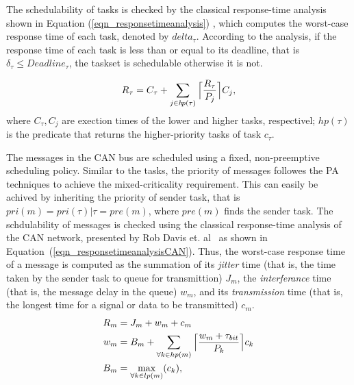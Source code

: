 {{The schedulability of tasks is checked by the classical response-time analysis shown in Equation (\ref{eqn_responsetimeanalysis}) \cite{Baruah2011Response-timeSystems,Baruah2011Response-timeSystems}, which computes the worst-case response time of each task, denoted by $delta_\tau$. According to the analysis, if the response time of each task is less than or equal to its deadline, that is $\delta_\tau\leq Deadline_\tau$, the taskset is schedulable otherwise it is not. 

\begin{align}
\label{eqn_responsetimeanalysis}
R_\tau=C_\tau+\sum_{j\in h\!p(\tau)}
{
	\ceil[\Big]
	{
		\frac{R_\tau}{P_j}
	}C_j
},
\end{align}
where $C_\tau,C_j$ are exection times of the lower and higher tasks, respectivel; $h\!p(\tau)$ is the predicate that returns the higher-priority tasks of task $c_\tau$.


The messages in the CAN bus are scheduled using a fixed, non-preemptive scheduling policy. Similar to the tasks, the priority of messages followes the PA techniques to achieve the mixed-criticality requirement. This can easily be achived by inheriting the priority of sender task, that is $pri(m)=pri(\tau)|\tau = pre(m)$, where $pre(m)$ finds the sender task. The schdulability of messages is checked using the classical response-time analysis of the CAN network, presented by Rob Davis et. al~\cite{RobDavis-CAN-2007} as shown in Equation~(\ref{eqn_responsetimeanalysisCAN}). Thus, the worst-case response time of a message is computed as the summation of its \textit{jitter} time (that is, the time  taken by the sender task to queue for transmittion) $J_m$, the \textit{interferance} time (that is, the message delay in the queue) $w_m$, and its \textit{transmission} time  (that is, the longest time for a signal or data to be transmitted) $c_m$.
\begin{align}
\label{eqn_responsetimeanalysisCAN}
R_m&=J_m+w_m+c_m\\
\label{eqn_interference}
w_m&=B_m+
\sum_{\forall k\in hp(m)}
{
	\ceil[\Big]
	{
		\frac{w_m+\tau_{bit}}{P_k}
	}c_k
}\\
\label{eqn_iblocking}
B_m&=\max_{\forall k\in lp(m)}(c_k),
\end{align}

}}
